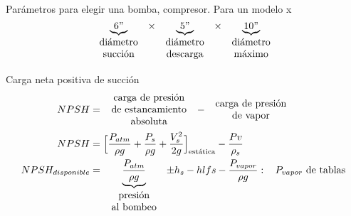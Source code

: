 Parámetros para elegir una bomba, compresor. Para un modelo x
\[
    \underbrace{ 6" }_{
        \begin{array}{cc}
            \text{ diámetro }\\
            \text{ succión }
        \end{array}} \times
    \underbrace{ 5" }_{
        \begin{array}{cc}
            \text{ diámetro }\\
            \text{ descarga }
        \end{array}} \times
    \underbrace{ 10" }_{
        \begin{array}{cc}
            \text{ diámetro }\\
            \text{ máximo }
        \end{array}}
\]

Carga neta positiva de succión
\[
    \begin{split}
        NPSH & = 
        \begin{array}{cc}
            \text{ carga de presión } \\
            \text{ de estancamiento } \\
            \text{ absoluta } 
        \end{array} -
        \begin{array}{cc}
             \text{ carga de presión }\\
             \text{ de vapor }
        \end{array} \\
        NPSH & = \Big[ \frac{ P_{atm} }{ \rho g } + \frac{ P_{s} }{ \rho g } + \frac{ V_{s}^{2} }{ 2g } \Big]_{ \text{estática} } - \frac{ Pv }{ \rho_{s} } \\
        NPSH_{disponible} & = \underbrace{ \frac{ P_{atm} }{ \rho g } }_{
            \begin{array}{cc}
                \text{ presión }\\
                \text{ al bombeo }
            \end{array}                                 
        } \pm h_{s} - hlfs - \frac{ P_{vapor} }{ \rho g }: \;\; \text{ \( P_{vapor} \) de tablas }
    \end{split}
\]

